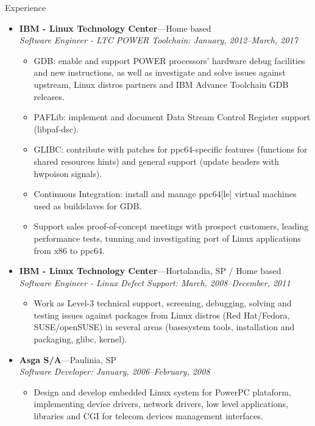 \documentclass[11pt,oneside]{article}
\newenvironment{ressection}[1]{
	\vspace{4pt}
	{\selectfont\Large#1}
	\begin{itemize}
	\vspace{3pt}
}{
	\end{itemize}
}
\newcommand{\ressubitem}[1]{
	\vspace{-1pt}
	\item \begin{flushleft} #1 \end{flushleft}
}
\newcommand{\resbigitem}[3]{
	\vspace{-5pt}
	\item
	\textbf{#1}---#2 \\
	\textit{#3}
}
\newenvironment{ressubsec}[3]{
	\resbigitem{#1}{#2}{#3}
	\vspace{-2pt}
	\begin{itemize}
}{
	\end{itemize}
}
\begin{document}
\begin{ressection}{Experience}

	\begin{ressubsec}{IBM - Linux Technology Center}{Home based}{Software Engineer - LTC POWER Toolchain: January, 2012--March, 2017}

		\ressubitem{GDB: enable and support POWER processors' hardware
		debug facilities and new instructions, as well as investigate
		and solve issues against upstream, Linux distros partners and
		IBM Advance Toolchain GDB releases.}

		\ressubitem{PAFLib: implement and document Data Stream Control
		Register support (libpaf-dsc).}

		\ressubitem{GLIBC: contribute with patches for ppc64-specific
		features (functions for shared resources hints) and general
		support (update headers with hwpoison signals).}

		\ressubitem{Continuous Integration: install and manage
		ppc64[le] virtual machines used as buildslaves for GDB.}

		\ressubitem{Support sales proof-of-concept meetings with
		prospect customers, leading performance tests, tunning and
		investigating port of Linux applications from x86 to ppc64.}

	\end{ressubsec}

	\begin{ressubsec}{IBM - Linux Technology Center}{Hortolandia, SP / Home based}{Software Engineer - Linux Defect Support: March, 2008--December, 2011}

		\ressubitem{Work as Level-3 technical support, screening,
		debugging, solving and testing issues against packages from
		Linux distros (Red Hat/Fedora, SUSE/openSUSE) in several areas
		(basesystem tools, installation and packaging, glibc, kernel).}

	\end{ressubsec}

	\begin{ressubsec}{Asga S/A}{Paulinia, SP}{Software Developer: January, 2006--February, 2008}

		\ressubitem{Design and develop embedded Linux system for
		PowerPC plataform, implementing device drivers, network
		drivers, low level applications, libraries and CGI for
		telecom devices management interfaces.}

	\end{ressubsec}


\end{ressection}
\end{document}
